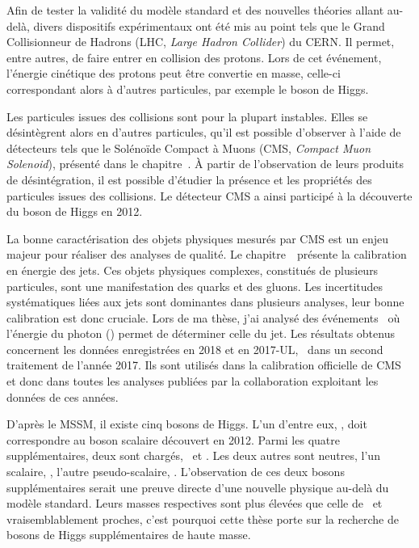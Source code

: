 \par
Afin de tester la validité du modèle standard et des nouvelles théories allant au-delà,
divers dispositifs expérimentaux ont été mis au point
tels que
le Grand Collisionneur de Hadrons (LHC, \emph{Large Hadron Collider})
du CERN.
Il permet, entre autres, de faire entrer en collision des protons.
Lors de cet événement,
l'énergie cinétique des protons
peut être convertie en masse,
celle-ci correspondant alors à d'autres particules,
par exemple le boson de Higgs.
\par
Les particules issues des collisions sont pour la plupart instables.
Elles se désintègrent alors en d'autres particules,
qu'il est possible d'observer à l'aide de détecteurs tels que
le Solénoïde Compact à Muons (CMS, \emph{Compact Muon Solenoid}),
présenté dans le chapitre~.
À partir de l'observation de leurs produits de désintégration,
il est possible d'étudier la présence et les propriétés des particules issues des collisions.
Le détecteur CMS a ainsi participé à la découverte du boson de Higgs en 2012.
\par
La bonne caractérisation des objets physiques mesurés par CMS est un enjeu majeur
pour réaliser des analyses de qualité.
Le chapitre~\ présente la calibration en énergie des jets.
Ces objets physiques complexes, constitués de plusieurs particules,
sont une manifestation des quarks et des gluons.
Les incertitudes systématiques liées aux jets sont dominantes dans plusieurs analyses,
leur bonne calibration est donc cruciale.
Lors de ma thèse, j'ai analysé des événements \Gjets\
où l'énergie du photon (\photon) permet de déterminer celle du jet.
Les résultats obtenus
concernent les données enregistrées en 2018 et en 2017-UL,
\ie\ dans un second traitement de l'année 2017.
Ils sont utilisés dans la calibration officielle de CMS
et donc dans toutes les analyses publiées par la collaboration
exploitant les données de ces années.
\par
D'après le MSSM,
il existe cinq bosons de Higgs.
L'un d'entre eux, \higgs, doit correspondre au boson scalaire découvert en 2012.
Parmi les quatre supplémentaires, deux sont chargés, \Higgsplus\ et \Higgsminus.
Les deux autres sont neutres,
l'un scalaire, \Higgs,
l'autre pseudo-scalaire, \HiggsA.
L'observation de ces deux 
bosons supplémentaires
serait une preuve directe d'une nouvelle physique au-delà du modèle standard.
Leurs masses respectives sont plus élevées que celle de \higgs\
et vraisemblablement proches,
c'est pourquoi cette thèse porte sur la
recherche de bosons de Higgs supplémentaires de haute masse.
